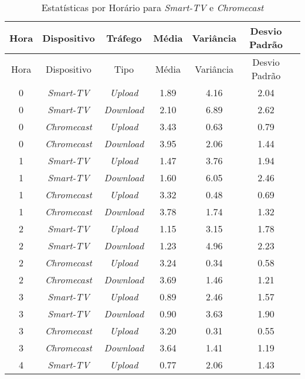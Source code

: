 \begin{longtable}{|c|c|c|c|c|c|c|}
    \caption{Estatísticas por Horário para \textit{Smart-TV} e \textit{Chromecast}}
    \label{tab:estatisticas_por_horario} \\
    \hline
    Hora & Dispositivo & Tráfego & Média & Variância & Desvio Padrão \\
    \hline
    \endfirsthead

    \hline
    Hora & Dispositivo & Tipo & Média & Variância & Desvio Padrão \\
    \hline
    \endhead

    \hline
    \endfoot

    \hline
    \endlastfoot

    0 & \textit{Smart-TV} & \textit{Upload} & 1.89 & 4.16 & 2.04 \\
    0 & \textit{Smart-TV} & \textit{Download} & 2.10 & 6.89 & 2.62 \\
    0 & \textit{Chromecast} & \textit{Upload} & 3.43 & 0.63 & 0.79 \\
    0 & \textit{Chromecast} & \textit{Download} & 3.95 & 2.06 & 1.44 \\
    \hline
    1 & \textit{Smart-TV} & \textit{Upload} & 1.47 & 3.76 & 1.94 \\
    1 & \textit{Smart-TV} & \textit{Download} & 1.60 & 6.05 & 2.46 \\
    1 & \textit{Chromecast} & \textit{Upload} & 3.32 & 0.48 & 0.69 \\
    1 & \textit{Chromecast} & \textit{Download} & 3.78 & 1.74 & 1.32 \\
    \hline
    2 & \textit{Smart-TV} & \textit{Upload} & 1.15 & 3.15 & 1.78 \\
    2 & \textit{Smart-TV} & \textit{Download} & 1.23 & 4.96 & 2.23 \\
    2 & \textit{Chromecast} & \textit{Upload} & 3.24 & 0.34 & 0.58 \\
    2 & \textit{Chromecast} & \textit{Download} & 3.69 & 1.46 & 1.21 \\
    \hline
    3 & \textit{Smart-TV} & \textit{Upload} & 0.89 & 2.46 & 1.57 \\
    3 & \textit{Smart-TV} & \textit{Download} & 0.90 & 3.63 & 1.90 \\
    3 & \textit{Chromecast} & \textit{Upload} & 3.20 & 0.31 & 0.55 \\
    3 & \textit{Chromecast} & \textit{Download} & 3.64 & 1.41 & 1.19 \\
    \hline
    4 & \textit{Smart-TV} & \textit{Upload} & 0.77 & 2.06 & 1.43 \\

\end{longtable}
